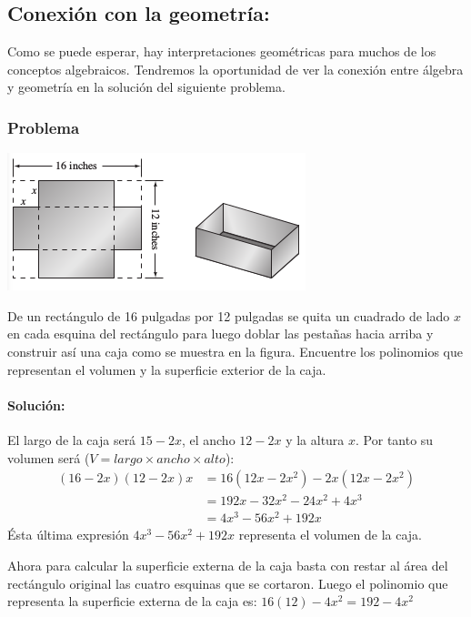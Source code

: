 \documentclass[10pt,twoside]{article}
\begin{document}
\subsection*{Conexión con la geometr\'{i}a:}
Como se puede esperar, hay interpretaciones geométricas para muchos de los conceptos algebraicos. Tendremos la oportunidad de ver la conexión entre álgebra y geometría en la solución del siguiente problema.
\subsubsection*{Problema}
\begin{minipage}{.65\textwidth}
\begin{center}
\includegraphics[scale=.75]{Images/caja_12in.png} 
\end{center}
\end{minipage}
\begin{minipage}{.35\textwidth}
De un rectángulo de 16 pulgadas por 12 pulgadas se quita un cuadrado de lado $x$ en cada esquina del rectángulo para luego doblar las pestañas hacia arriba y construir así una caja como se muestra en la figura. Encuentre los polinomios que representan el volumen y la superficie exterior de la caja.
\end{minipage}
\paragraph*{Solución:}

El largo de la caja será $15-2x$, el ancho $12-2x$ y la altura $x$. Por tanto su volumen será ($V=largo\times ancho \times alto$):
\begin{align*}
(16-2x)(12-2x)x&=16(12x-2x^2)-2x(12x-2x^2)\\
&=192x-32x^2-24x^2+4x^3\\
&=4x^3-56x^2+192x
\end{align*}
Ésta última expresión $4x^3-56x^2+192x$ representa el volumen de la caja.

Ahora para calcular la superficie externa de la caja basta con restar al área del rectángulo original las cuatro esquinas que se cortaron. Luego el polinomio que representa la superficie externa de la caja es: 
$16(12)-4x^2=192-4x^2$
\end{document}
